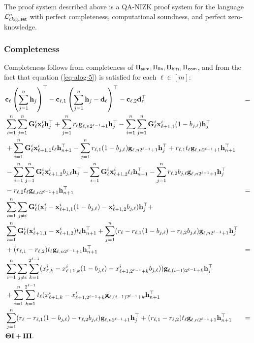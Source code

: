 \begin{theorem} \label{theo:bits}
The proof system described above is a QA-NIZK proof system for the language \(\mathcal{L}_{ck_{\mathsf{GS}},\mathsf{set}}^n\)
 with perfect completeness, computational soundness, and perfect zero-knowledge.
\end{theorem}	

\subsubsection{Completeness}
Completeness follows from completeness of \(\Pi_{\mathsf{sum}},\Pi_\mathsf{lin},\Pi_{\mathsf{bits}},\Pi_{\mathsf{com}}\), and from the fact that equation (\ref{eq-alog-5}) is satisfied for each \(\ell\in [m]\):
\begin{align*}
&\mathbf{c}_\ell\left(\sum_{j=1}^n \mathbf{h}_j\right)^\top-
\mathbf{c}_{\ell,1}\left(\sum_{j=1}^n\mathbf{h}_j-\mathbf{d}_\ell\right)^\top-
\mathbf{c}_{\ell,2}\mathbf{d}_\ell^\top &= \\
&\sum_{i=1}^n\sum_{j=1}^n\mathbf{{G}}^i_{\ell}\mathbf{x}^i_{\ell}\mathbf{h}_j^\top+\sum_{j=1}^nr_\ell\mathbf{g}_{\ell,n2^{\ell-1}+1}\mathbf{h}_j^\top
-\sum_{i=1}^n\sum_{j=1}^n\mathbf{{G}}^i_{\ell}\mathbf{x}^i_{\ell+1,1}(1-b_{j,\ell})\mathbf{h}_j^\top\\
&+\sum_{i=1}^n\mathbf{{G}}^i_{\ell}\mathbf{x}^i_{\ell+1,1} t_\ell\mathbf{h}_{n+1}^\top-\sum_{j=1}^nr_{\ell,1}(1-b_{j,\ell})\mathbf{g}_{\ell,n2^{\ell-1}+1}\mathbf{h}_j^\top+ r_{\ell,1}t_\ell\mathbf{g}_{\ell,n2^{\ell-1}+1}\mathbf{h}_{n+1}^\top\\
&-\sum_{i=1}^n\sum_{j=1}^n\mathbf{{G}}^i_{\ell}\mathbf{x}^i_{\ell+1,2}b_{j,\ell}\mathbf{h}_j^\top-\sum_{i=1}^n\mathbf{{G}}^i_{\ell}\mathbf{x}^i_{\ell+1,2} t_\ell\mathbf{h}_{n+1}^\top-\sum_{j=1}^nr_{\ell,2}b_{j,\ell}\mathbf{g}_{\ell,n2^{\ell-1}+1}\mathbf{h}_j^\top\\
&- r_{\ell,2}t_\ell\mathbf{g}_{\ell,n2^{\ell-1}+1}\mathbf{h}_{n+1}^\top &=\\
&\sum_{i=1}^n\sum_{j\neq i}\mathbf{{G}}^i_\ell(\mathbf{x}^i_\ell-\mathbf{x}^i_{\ell+1,1}(1-b_{j,\ell})-\mathbf{x}^i_{\ell+1,2}b_{j,\ell})\mathbf{h}_j^\top+\\
&\sum_{i=1}^n\mathbf{{G}}^i_\ell(\mathbf{x}^i_{\ell+1,1}-\mathbf{x}^i_{\ell+1,2})t_\ell\mathbf{h}_{n+1}^\top+\sum_{j=1}^n(r_\ell-r_{\ell,1}(1-b_{j,\ell})-r_{\ell,2}b_{j,\ell})\mathbf{g}_{\ell,n2^{\ell-1}+1}\mathbf{h}_{j}^\top\\
&+(r_{\ell,1}-r_{\ell,2})t_\ell\mathbf{g}_{\ell,n2^{\ell-1}+1}\mathbf{h}_{n+1}^\top &=\\
&\sum_{i=1}^n\sum_{j\neq i}\sum_{k=1}^{2^{\ell-1}}(x^i_{\ell,k}-x^i_{\ell+1,k}(1-b_{j,\ell})-x^i_{\ell+1,2^{\ell-1}+k}b_{j,\ell}))\mathbf{g}_{\ell,(i-1)2^{\ell-1}+k}\mathbf{h}_j^\top\\
&+\sum_{i=1}^n\sum_{k=1}^{2^{\ell-1}}t_\ell(x^i_{\ell+1,k}-x^i_{\ell+1,2^{\ell-1}+k}\mathbf{g}_{\ell,(i-1)2^{\ell-1}+k}\mathbf{h}_{n+1}^\top\\
&\sum_{j=1}^n(r_\ell-r_{\ell,1}(1-b_{j,\ell})-r_{\ell,2}b_{j,\ell})\mathbf{g}_{\ell,n2^{\ell-1}+1}\mathbf{h}_{j}^\top+(r_{\ell,1}-r_{\ell,2})t_\ell\mathbf{g}_{\ell,n2^{\ell-1}+1}\mathbf{h}_{n+1}^\top &=\\
&\mathbf{{\Theta}}\mathbf{{I}}+\mathbf{{I}}\mathbf{{\Pi}}.
\end{align*}

